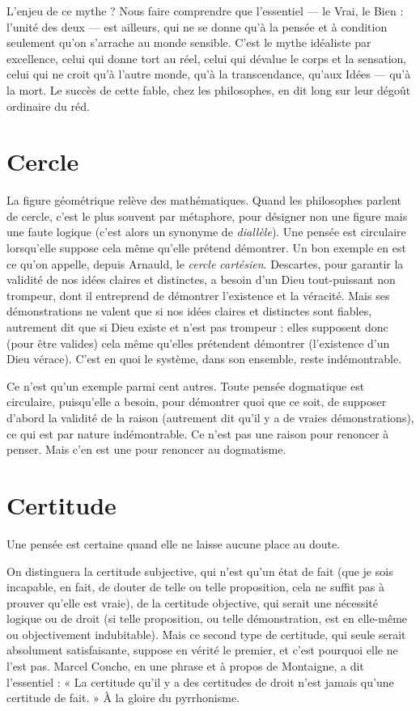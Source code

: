 L'enjeu de ce mythe ? Nous faire comprendre que l'essentiel — le Vrai, le
Bien : l’unité des deux — est ailleurs, qui ne se donne qu’à la pensée et à condition
seulement qu’on s’arrache au monde sensible. C’est le mythe idéaliste par
excellence, celui qui donne tort au réel, celui qui dévalue le corps et la sensation,
celui qui ne croit qu’à l’autre monde, qu’à la transcendance, qu’aux Idées
— qu'à la mort. Le succès de cette fable, chez les philosophes, en dit long sur
leur dégoût ordinaire du réd.

\section{Cercle}
La figure géométrique relève des mathématiques. Quand les philosophes
parlent de cercle, c’est le plus souvent par métaphore,
pour désigner non une figure mais une faute logique (c’est alors un synonyme
de {\it diallèle}). Une pensée est circulaire lorsqu’elle suppose cela même qu’elle prétend
démontrer. Un bon exemple en est ce qu’on appelle, depuis Arnauld, le
{\it cercle cartésien}. Descartes, pour garantir la validité de nos idées claires et distinctes,
a besoin d’un Dieu tout-puissant non trompeur, dont il entreprend de
démontrer l'existence et la véracité. Mais ses démonstrations ne valent que si
nos idées claires et distinctes sont fiables, autrement dit que si Dieu existe et
n’est pas trompeur : elles supposent donc (pour être valides) cela même qu’elles
prétendent démontrer (l'existence d’un Dieu vérace). C’est en quoi le système,
dans son ensemble, reste indémontrable.

Ce n’est qu’un exemple parmi cent autres. Toute pensée dogmatique est
circulaire, puisqu’elle a besoin, pour démontrer quoi que ce soit, de supposer
d’abord la validité de la raison (autrement dit qu’il y a de vraies démonstrations),
ce qui est par nature indémontrable. Ce n’est pas une raison pour
renoncer à penser. Mais c’en est une pour renoncer au dogmatisme.

\section{Certitude}
Une pensée est certaine quand elle ne laisse aucune place au
doute.

On distinguera la certitude subjective, qui n’est qu’un état de fait (que je
sois incapable, en fait, de douter de telle ou telle proposition, cela ne suffit pas
à prouver qu’elle est vraie), de la certitude objective, qui serait une nécessité
logique ou de droit (si telle proposition, ou telle démonstration, est en elle-même
ou objectivement indubitable). Mais ce second type de certitude, qui
seule serait absolument satisfaisante, suppose en vérité le premier, et c’est pourquoi
elle ne l’est pas. Marcel Conche, en une phrase et à propos de Montaigne,
a dit l’essentiel : « La certitude qu’il y a des certitudes de droit n’est jamais
qu’une certitude de fait. » À la gloire du pyrrhonisme.

